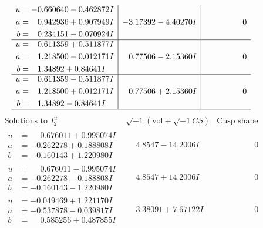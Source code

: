 \documentclass[1p]{elsarticle_modified}
\theoremstyle{definition}
\newcommand{\I}{\sqrt{-1}}
\begin{document}
$$\begin{array}{c|c|c}
\begin{aligned}
u &= -0.660640 - 0.462872 I \\
a &= \phantom{-}0.942936 + 0.907949 I \\
b &= \phantom{-}0.234151 - 0.070924 I\end{aligned}
 & -3.17392 - 4.40270 I & \phantom{-0.000000 } 0 \\ \hline\begin{aligned}
u &= \phantom{-}0.611359 + 0.511877 I \\
a &= \phantom{-}1.218500 - 0.012171 I \\
b &= \phantom{-}1.34892 + 0.84641 I\end{aligned}
 & \phantom{-}0.77506 - 2.15360 I & \phantom{-0.000000 } 0 \\ \hline\begin{aligned}
u &= \phantom{-}0.611359 - 0.511877 I \\
a &= \phantom{-}1.218500 + 0.012171 I \\
b &= \phantom{-}1.34892 - 0.84641 I\end{aligned}
 & \phantom{-}0.77506 + 2.15360 I & \phantom{-0.000000 } 0\\
 \hline 
 \end{array}$$\newpage$$\begin{array}{c|c|c}  
\text{Solutions to }I^u_{2}& \I (\text{vol} + \sqrt{-1}CS) & \text{Cusp shape}\\
 \hline 
\begin{aligned}
u &= \phantom{-}0.676011 + 0.995074 I \\
a &= -0.262278 + 0.188808 I \\
b &= -0.160143 + 1.220980 I\end{aligned}
 & \phantom{-}4.8547 - 14.2006 I & \phantom{-0.000000 } 0 \\ \hline\begin{aligned}
u &= \phantom{-}0.676011 - 0.995074 I \\
a &= -0.262278 - 0.188808 I \\
b &= -0.160143 - 1.220980 I\end{aligned}
 & \phantom{-}4.8547 + 14.2006 I & \phantom{-0.000000 } 0 \\ \hline\begin{aligned}
u &= -0.049469 + 1.221170 I \\
a &= -0.537878 - 0.039817 I \\
b &= \phantom{-}0.585256 + 0.487855 I\end{aligned}
 & \phantom{-}3.38091 + 7.67122 I & \phantom{-0.000000 } 0 \\ \hline\begin{aligned}

\end{aligned}
\end{array}$$
\end{document}

